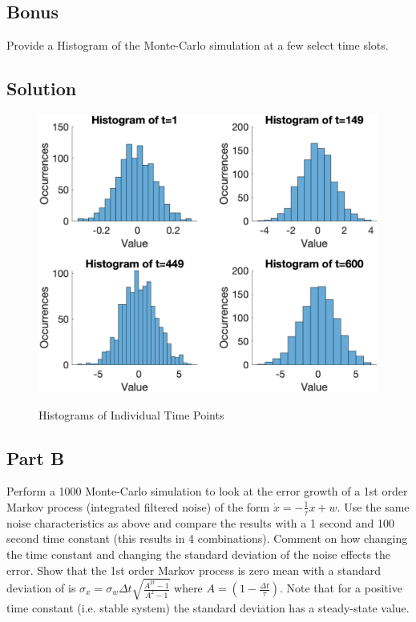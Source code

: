 \documentclass{article}
\begin{document}
\subsection*{Bonus}
Provide a Histogram of the Monte-Carlo simulation at a few select time slots.

\subsection*{Solution}
\begin{figure}[H]
    \centering
    \includegraphics[width=0.75\linewidth]{../figures/p2_bonus.png}\label{fig:p2_bonus}
    \caption{Histograms of Individual Time Points}
\end{figure}

\subsection*{Part B}
Perform a 1000 Monte-Carlo simulation to look at the error growth of a 1st order Markov
process (integrated filtered noise) of the form $\dot{x} = -\frac{1}{\tau}x+w$. Use the same noise characteristics as above and compare the results with a 1 second and 100 second time
constant (this results in 4 combinations). Comment on how changing the time constant
and changing the standard deviation of the noise effects the error. Show that the 1st order
Markov process is zero mean with a standard deviation of is $\sigma_x = \sigma_w\Delta t\sqrt{\frac{A^{2t}-1}{A^2-1}}$ where $A = (1-\frac{\Delta t}{\tau})$. Note that for a positive time constant (i.e. stable system) the standard deviation has a steady-state value.
\end{document}
